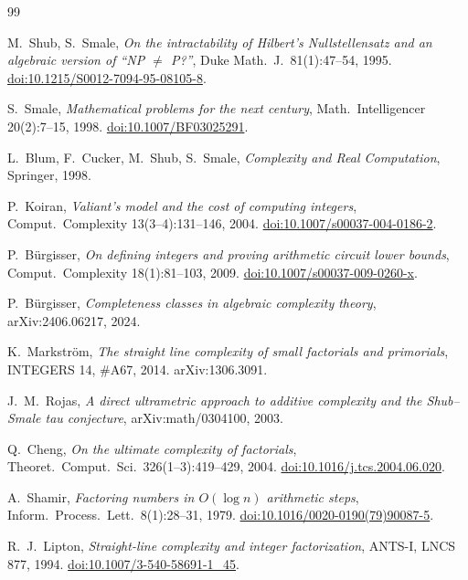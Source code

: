 \documentclass[11pt]{article}
\theoremstyle{definition}
\theoremstyle{remark}
\begin{document}
\begin{thebibliography}{99}\small

 M.~Shub, S.~Smale,
\emph{On the intractability of Hilbert's Nullstellensatz and an algebraic version of
``NP $\ne$ P?''}, Duke Math.\ J.\ 81(1):47--54, 1995.
\href{https://doi.org/10.1215/S0012-7094-95-08105-8}{doi:10.1215/S0012-7094-95-08105-8}.

 S.~Smale, \emph{Mathematical problems for the next century},
Math.\ Intelligencer 20(2):7--15, 1998.
\href{https://doi.org/10.1007/BF03025291}{doi:10.1007/BF03025291}.

 L.~Blum, F.~Cucker, M.~Shub, S.~Smale, \emph{Complexity and Real
Computation}, Springer, 1998.

 P.~Koiran, \emph{Valiant's model and the cost of computing
integers}, Comput.\ Complexity 13(3--4):131--146, 2004.
\href{https://doi.org/10.1007/s00037-004-0186-2}{doi:10.1007/s00037-004-0186-2}.

 P.~B\"urgisser, \emph{On defining integers and proving
arithmetic circuit lower bounds}, Comput.\ Complexity 18(1):81--103, 2009.
\href{https://doi.org/10.1007/s00037-009-0260-x}{doi:10.1007/s00037-009-0260-x}.

 P.~B\"urgisser, \emph{Completeness classes in algebraic
complexity theory}, arXiv:2406.06217, 2024.

 K.~Markstr\"om, \emph{The straight line complexity of small
factorials and primorials}, INTEGERS 14, \#A67, 2014. arXiv:1306.3091.

 J.~M.~Rojas, \emph{A direct ultrametric approach to additive
complexity and the Shub--Smale tau conjecture}, arXiv:math/0304100, 2003.

 Q.~Cheng, \emph{On the ultimate complexity of factorials},
Theoret.\ Comput.\ Sci.\ 326(1--3):419--429, 2004.
\href{https://doi.org/10.1016/j.tcs.2004.06.020}{doi:10.1016/j.tcs.2004.06.020}.

 A.~Shamir, \emph{Factoring numbers in $O(\log n)$ arithmetic
steps}, Inform.\ Process.\ Lett.\ 8(1):28--31, 1979.
\href{https://doi.org/10.1016/0020-0190(79)90087-5}{doi:10.1016/0020-0190(79)90087-5}.

 R.~J.~Lipton, \emph{Straight-line complexity and integer
factorization}, ANTS-I, LNCS 877, 1994.
\href{https://doi.org/10.1007/3-540-58691-1_45}{doi:10.1007/3-540-58691-1\_45}.


\end{thebibliography}
\end{document}

